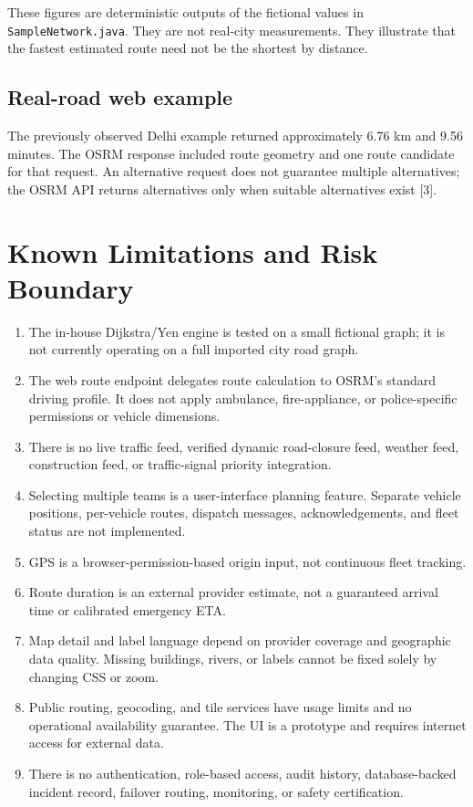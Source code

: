\documentclass[11pt,a4paper]{article}
\begin{document}
These figures are deterministic outputs of the fictional values in \texttt{SampleNetwork.java}. They are not real-city measurements. They illustrate that the fastest estimated route need not be the shortest by distance.

\subsection{Real-road web example}
The previously observed Delhi example returned approximately 6.76 km and 9.56 minutes. The OSRM response included route geometry and one route candidate for that request. An alternative request does not guarantee multiple alternatives; the OSRM API returns alternatives only when suitable alternatives exist [3].

\section{Known Limitations and Risk Boundary}
\begin{enumerate}
  \item The in-house Dijkstra/Yen engine is tested on a small fictional graph; it is not currently operating on a full imported city road graph.
  \item The web route endpoint delegates route calculation to OSRM's standard driving profile. It does not apply ambulance, fire-appliance, or police-specific permissions or vehicle dimensions.
  \item There is no live traffic feed, verified dynamic road-closure feed, weather feed, construction feed, or traffic-signal priority integration.
  \item Selecting multiple teams is a user-interface planning feature. Separate vehicle positions, per-vehicle routes, dispatch messages, acknowledgements, and fleet status are not implemented.
  \item GPS is a browser-permission-based origin input, not continuous fleet tracking.
  \item Route duration is an external provider estimate, not a guaranteed arrival time or calibrated emergency ETA.
  \item Map detail and label language depend on provider coverage and geographic data quality. Missing buildings, rivers, or labels cannot be fixed solely by changing CSS or zoom.
  \item Public routing, geocoding, and tile services have usage limits and no operational availability guarantee. The UI is a prototype and requires internet access for external data.
  \item There is no authentication, role-based access, audit history, database-backed incident record, failover routing, monitoring, or safety certification.
\end{enumerate}
\end{document}
